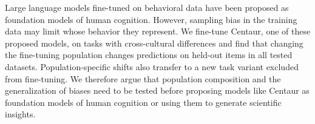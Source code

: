 Large language models fine-tuned on behavioral data have been proposed as foundation models of human cognition. However, sampling bias in the training data may limit whose behavior they represent. We fine-tune Centaur, one of these proposed models, on tasks with cross-cultural differences and find that changing the fine-tuning population changes predictions on held-out items in all tested datasets. Population-specific shifts also transfer to a new task variant excluded from fine-tuning. We therefore argue that population composition and the generalization of biases need to be tested before proposing models like Centaur as foundation models of human cognition or using them to generate scientific insights.

